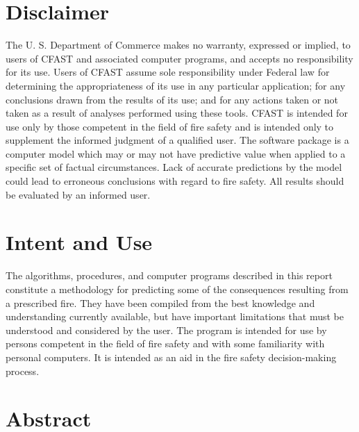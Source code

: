 \documentclass[12pt]{book}
\begin{document}
\newpage

\frontmatter

\pagestyle{plain}
\setcounter{page}{3}

\chapter{Disclaimer}

The U. S. Department of Commerce makes no warranty, expressed or implied, to users of 
CFAST and associated computer programs, and accepts no responsibility for its use.  Users of 
CFAST assume sole responsibility under Federal law for determining the appropriateness of its 
use in any particular application; for any conclusions drawn from the results of its use; and for 
any actions taken or not taken as a result of analyses performed using these tools. 
CFAST is intended for use only by those competent in the field of fire safety and is intended 
only to supplement the informed judgment of a qualified user. The software package is a 
computer model which may or may not have predictive value when applied to a specific set of 
factual circumstances. Lack of accurate predictions by the model could lead to erroneous 
conclusions with regard to fire safety. All results should be evaluated by an informed user.

\chapter{Intent and Use}

The algorithms, procedures, and computer programs described in this report constitute a 
methodology for predicting some of the consequences resulting from a prescribed fire.  They 
have been compiled from the best knowledge and understanding currently available, but have 
important limitations that must be understood and considered by the user.  The program is 
intended for use by persons competent in the field of fire safety and with some familiarity with 
personal computers. It is intended as an aid in the fire safety decision-making process.

\chapter{Abstract}
\end{document}
